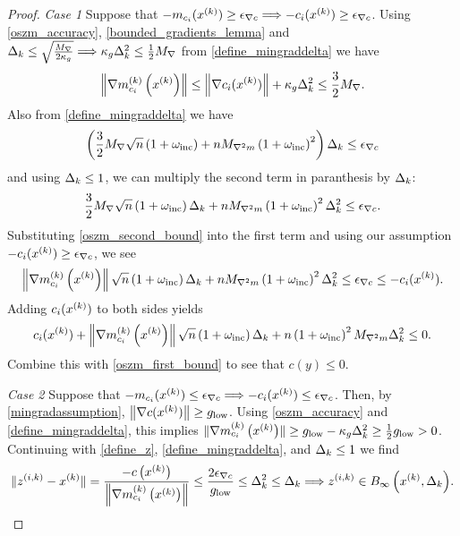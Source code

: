 \begin{proof}
\emph{Case 1}
Suppose that $-m_{c_i}(x^{(k)}) \ge {\epsilon_{\nabla c}} \Longrightarrow -c_i(x^{(k)}) \ge {\epsilon_{\nabla c}}$.
Using \cref{oszm_accuracy}, \cref{bounded_gradients_lemma} and 
$\Delta_k \le \sqrt{\frac {{M_{\nabla}}} {2\kappa_g}} \Longrightarrow \kappa_g \Delta_k^2 \le \frac 1 2 {M_{\nabla}}$ from \cref{define_mingraddelta} we have
\begin{align}
\label{oszm_second_bound}
\left\| {\nabla m_{c_i}^{(k)}\left(x^{(k)}\right)} \right\| \le \left\|\nabla c_i(x^{(k)})\right\| + \kappa_g \Delta_k^2 \le \frac 3 2 {M_{\nabla}}.
\end{align}
Also from \cref{define_mingraddelta} we have
\begin{align*}
\left(\frac 3 2 {M_{\nabla}}\sqrt{n} \left(1 + \omega_{\text{inc}}\right) + n {M_{\nabla^2 m}} \left(1 + \omega_{\text{inc}}\right)^2 \right)\Delta_k \le {\epsilon_{\nabla c}}
\end{align*}
and using $\Delta_k \le 1$, we can multiply the second term in paranthesis by $\Delta_k$:
\begin{align*}
\frac 3 2 {M_{\nabla}}\sqrt{n} \left(1 + \omega_{\text{inc}}\right) \Delta_k + n {M_{\nabla^2 m}} \left(1 + \omega_{\text{inc}}\right)^2\Delta_k^2 \le {\epsilon_{\nabla c}}.
\end{align*}
Substituting \cref{oszm_second_bound} into the first term and using our assumption $-c_i(x^{(k)}) \ge {\epsilon_{\nabla c}}$, we see
\begin{align*}
\left\|{\nabla m_{c_i}^{(k)}\left(x^{(k)}\right)}\right\|\sqrt{n}\left(1 + \omega_{\text{inc}}\right) \Delta_k + n {M_{\nabla^2 m}} \left(1 + \omega_{\text{inc}}\right)^2\Delta_k^2  \le {\epsilon_{\nabla c}} \le -c_i(x^{(k)}).
\end{align*}
Adding $c_i(x^{(k)})$ to both sides yields
\begin{align*}
c_i(x^{(k)}) + \left\|{\nabla m_{c_i}^{(k)}\left(x^{(k)}\right)}\right\|\sqrt{n}\left(1 + \omega_{\text{inc}}\right) \Delta_k + n \left(1 + \omega_{\text{inc}}\right)^2{M_{\nabla^2 m}}\Delta_k^2 \le 0.
\end{align*}
Combine this with \cref{oszm_first_bound} to see that $c(y) \le 0$.


\emph{Case 2}
Suppose that $-m_{c_i}(x^{(k)}) \le {\epsilon_{\nabla c}} \Longrightarrow -c_i(x^{(k)}) \le {\epsilon_{\nabla c}}$.
Then, by \cref{mingradassumption}, 
$\left\|\nabla c(x^{(k)}) \right\| \ge { g_{\textrm{low}} }$.
Using \cref{oszm_accuracy} and \cref{define_mingraddelta}, this implies
$\|{\nabla m_{c_i}^{(k)}\left(x^{(k)}\right)}\| \ge { g_{\textrm{low}} } - \kappa_g \Delta_k^2 \ge \frac 1 2 { g_{\textrm{low}} } > 0$.
Continuing with \cref{define_z}, \cref{define_mingraddelta}, and $\Delta_k \le 1$ we find
\begin{align*}
\|{z^{(i, k)}}-x^{(k)}\| = \frac{-c\left(x^{(k)}\right)}{\left\|{\nabla m_{c_i}^{(k)}\left(x^{(k)}\right)}\right\|} \le \frac{2{\epsilon_{\nabla c}}}{{ g_{\textrm{low}} }}\le \Delta_k^2 \le \Delta_k \Longrightarrow {z^{(i, k)}} \in { B_{\infty}\left(x^{(k)}, \Delta_k\right) }.
\end{align*}
\end{proof}

